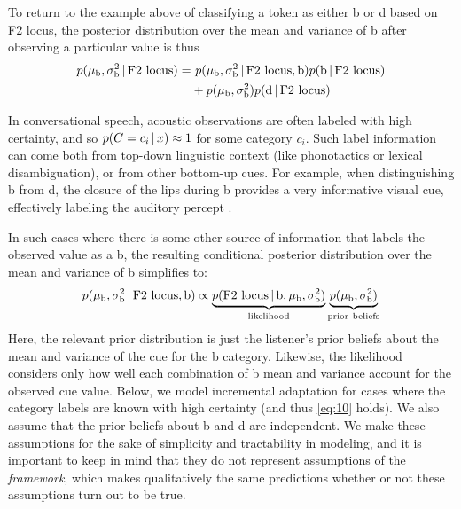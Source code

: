 To return to the example above of classifying a token as either \ph b or \ph d based on F2 locus, the posterior distribution over the mean and variance of \ph b after observing a particular \ftwolocus value is thus
\begin{align*}
  p(\mu_{\mathrm{b}}, \sigma^2_{\mathrm{b}} \,|\, \mathrm{F2\ locus }) = &\  p(\mu_{\mathrm{b}}, \sigma^2_{\mathrm{b}} \,|\, \mathrm{F2\ locus }, \mathrm{b}) p(\mathrm{b} \,|\, \mathrm{F2\ locus }) \\
&+ p(\mu_{\mathrm{b}}, \sigma^2_{\mathrm{b}}) p(\mathrm{d} \,|\, \mathrm{F2\ locus })
\end{align*}

In conversational speech, acoustic observations are often labeled with high certainty, and so $p(C=c_i \,|\, x) \approx 1$ for some category $c_i$.  Such label information can come both from top-down linguistic context (like phonotactics or lexical disambiguation), or from other bottom-up cues.  For example, when distinguishing \ph b from \ph d, the closure of the lips during \ph b provides a very informative visual cue, effectively labeling the auditory percept \autocite{Vroomen2004}.

In such cases where there is some other source of information that labels the observed \ftwolocus value as a \ph b, the resulting conditional posterior distribution over the mean and variance of \ph b simplifies to:
\begin{equation}
  \label{eq:10}
  p(\mu_\mrb, \sigma^2_\mrb \given \ftwolocus, \mrb) \propto
  \underbrace{p(\ftwolocus \given \mrb, \mu_\mrb, \sigma^2_\mrb)}_\mathrm{likelihood}
  \underbrace{p(\mu_\mrb, \sigma^2_\mrb)}_\mathrm{prior\ beliefs}
\end{equation}
Here, the relevant prior distribution is just the listener's prior beliefs about the mean and variance of the \ftwolocus cue for the \ph b category.  Likewise, the likelihood considers only how well each combination of \ph b mean and variance account for the observed cue value.  Below, we model incremental adaptation for cases where the category labels are known with high certainty (and thus \eqref{eq:10} holds).  We also assume that the prior beliefs about \ph b and \ph d are independent.  We make these assumptions for the sake of simplicity and tractability in modeling, and it is important to keep in mind that they do not represent assumptions of the \emph{framework}, which makes qualitatively the same predictions whether or not these assumptions turn out to be true.

